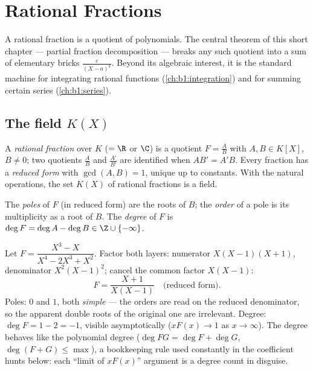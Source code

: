 \chapter{Rational Fractions}\label{ch:b1:fractions}

A rational fraction is a quotient of polynomials. The central theorem
of this short chapter --- partial fraction
decomposition --- breaks any
such quotient into a sum of elementary bricks $\frac{c}{(X - a)^k}$.
Beyond its algebraic interest, it is the standard machine for
integrating rational functions (\cref{ch:b1:integration}) and for
summing certain series (\cref{ch:b1:series}).

\section{The field $K(X)$}

\begin{definition}\label{def:b1:fractions:field}
A \emph{rational fraction} over $K$ ($= \R$
or $\C$) is a quotient $F = \frac{A}{B}$ with $A, B \in K[X]$, $B \neq
0$; two quotients $\frac AB$ and $\frac{A'}{B'}$ are identified when
$AB' = A'B$. Every fraction has a \emph{reduced form} with
$\gcd(A, B) = 1$, unique up to constants. With the natural operations,
the set $K(X)$ of rational fractions is a field.

The \emph{poles} of $F$ (in reduced form) are the roots of
$B$; the \emph{order} of a pole is its multiplicity as a root of $B$.
The \emph{degree} of $F$ is $\deg F = \deg A - \deg B \in \Z \cup
\{-\infty\}$.
\end{definition}

\begin{example}\label{ex:b1:fractions:vocab}
Let $F = \dfrac{X^3 - X}{X^4 - 2X^3 + X^2}$. Factor both layers:
numerator $X(X-1)(X+1)$, denominator $X^2(X-1)^2$; cancel the
common factor $X(X-1)$:
\[
F = \frac{X + 1}{X(X - 1)} \quad\text{(reduced form).}
\]
Poles: $0$ and $1$, both \emph{simple} --- the orders are read on
the reduced denominator, so the apparent double roots of the
original one are irrelevant. Degree: $\deg F = 1 - 2 = -1$,
visible asymptotically ($xF(x) \to 1$ as $x \to \infty$). The
degree behaves like the polynomial degree ($\deg FG = \deg F +
\deg G$, $\deg(F + G) \leq \max$), a bookkeeping rule used
constantly in the coefficient hunts below: each ``limit of
$xF(x)$'' argument is a degree count in disguise.
\end{example}

